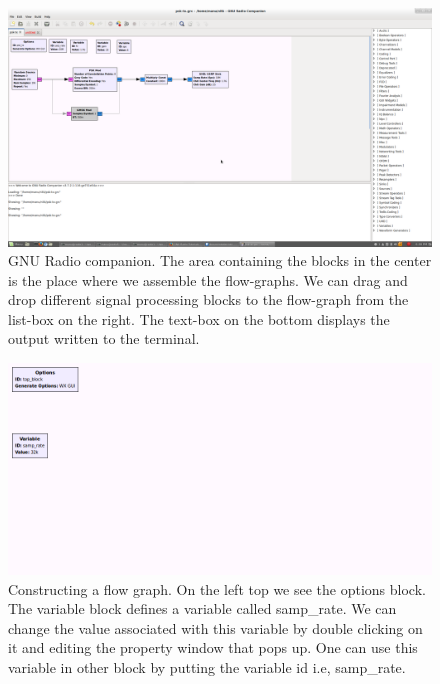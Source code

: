 \documentclass[a4paper,10pt]{report}
\begin{document}
\begin{figure}
\centering
 \includegraphics[scale=0.23]{figures/grc.png}
 \caption{GNU Radio companion. The area containing the blocks in the center is the place where we assemble the flow-graphs.
 We can drag and drop different signal processing blocks to the flow-graph from the list-box on the right.
 The text-box on the bottom displays the output written to the terminal.\label{fig:grc}}
\end{figure}
\begin{figure}
\centering
 \includegraphics[scale=0.4]{figures/gnuradio-new-flowgraph.png}
 \caption{Constructing a flow graph. On the left top we see the options block. The variable block defines a variable called samp\_rate.
 We can change the value associated with this variable by double clicking on it and editing the property window that pops up.
 One can use this variable in other block by putting the variable id i.e, samp\_rate.
 \label{fig:newgraph}}
\end{figure}
\end{document}
